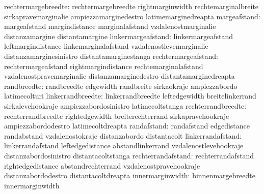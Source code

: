              rechtermargebreedte: rechtermargebreedte              rightmarginwidth
                                  rechtemarginalbreite             sirkapravemarginalie
                                  ampiezzamarginedestro            latimemarginedreapta
                    margeafstand: margeafstand                     margindistance
                                  marginalafstand                  vzdalenostmarginalie
                                  distanzamargine                  distantamargine
              linkermargeafstand: linkermargeafstand               leftmargindistance
                                  linkemarginalafstand             vzdalenostlevemarginalie
                                  distanzamarginesinistro          distantamarginestanga
             rechtermargeafstand: rechtermargeafstand              rightmargindistance
                                  rechtemarginalafstand            vzdalenostpravemarginalie
                                  distanzamarginedestro            distantamarginedreapta
                     randbreedte: randbreedte                      edgewidth
                                  randbreite                       sirkaokraje
                                  ampiezzabordo                    latimecolturi
               linkerrandbreedte: linkerrandbreedte                leftedgewidth
                                  breitelinkerrand                 sirkalevehookraje
                                  ampiezzabordosinistro            latimecoltstanga
              rechterrandbreedte: rechterrandbreedte               rightedgewidth
                                  breiterechterrand                sirkapravehookraje
                                  ampiezzabordodestro              latimecoltdreapta
                     randafstand: randafstand                      edgedistance
                                  randabstand                      vzdalenostokraje
                                  distanzabordo                    distantacolt
               linkerrandafstand: linkerrandafstand                leftedgedistance
                                  abstandlinkerrand                vzdalenostlevehookraje
                                  distanzabordosinistro            distantacoltstanga
              rechterrandafstand: rechterrandafstand               rightedgedistance
                                  abstandrechterrand               vzdalenostpravehookraje
                                  distanzabordodestro              distantacoltdreapta
 innermarginwidth:   binnenmargebreedte  innermarginwidth
